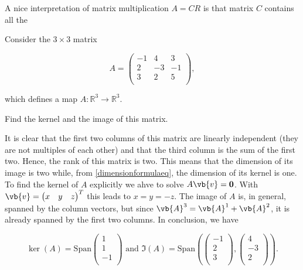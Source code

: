 \documentclass[a4paper,12pt]{report}
\begin{document}
A nice interpretation of matrix multiplication \(A = CR\) is that matrix \(C\) contains all the  

{Consider the \(3 \times 3\) matrix

\begin{equation}
    A = \begin{pmatrix}
        -1 & 4 &  3 \\
        2 & -3 &  -1 \\
        3 & 2 &  5 \\
    \end{pmatrix},
\end{equation}

which defines a map \(A: \mathbb{R}^3 \rightarrow \mathbb{R}^3 \). 

Find the kernel and the image of this matrix.}
{It is clear that the first two columns of this matrix are linearly independent (they are not multiples of each other) and that the third column is the sum of the first two. Hence, the rank of this matrix is two. This means that the dimension of its image is two while, from \cref{dimensionformulaeq}, the dimension of its kernel is one. To find the kernel of \(A\) explicitly we ahve to solve \(A\vb{v} = \boldsymbol{0} \). With \(\vb{v} = \begin{pmatrix}
    x & y &  z \\
\end{pmatrix}^{T} \) this leads to \(x=y=-z\). The image of \(A\) is, in general, spanned by the column vectors, but since \(\vb{A} ^3 = \vb{A} ^{1} + \vb{A} ^2  \), it is already spanned by the first two columns. In conclusion, we have

\begin{equation}
    \ker (A) = \text{Span} \begin{pmatrix}
         1 \\
         1 \\
         -1 \\
    \end{pmatrix} \text { and } \Im (A) = \text{Span} \left( \begin{pmatrix}
         -1 \\
         2 \\
         3 \\
    \end{pmatrix}, \begin{pmatrix}
         4 \\
         -3 \\
         2 \\
    \end{pmatrix} \right). 
\end{equation}} 
\end{document}
